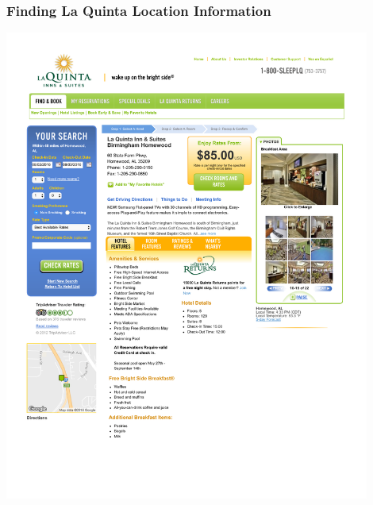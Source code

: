 \documentclass[12pt]{beamer}
\begin{document}

\begin{frame}[t]
\frametitle{Finding La Quinta Location Information}

\vspace{-4mm}

\begin{center}
\includegraphics[width=0.9\textwidth]{imgs/lq_hotel_page.pdf}
\end{center}

\end{frame}

\end{document}
